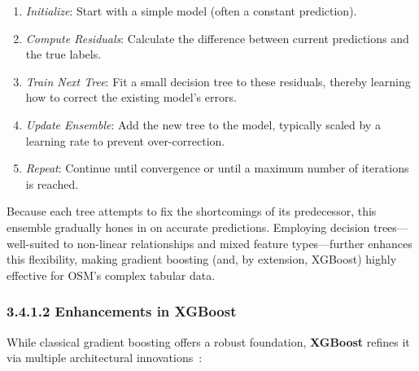 \documentclass[
    13pt, %
    a4paper, %
    listof=totoc, %
    bibliography=totoc, %
    index=totoc, %
    headsepline
]{scrreprt}
\begin{document}
\begin{enumerate}
    \item \emph{Initialize}: Start with a simple model (often a constant prediction).
    \item \emph{Compute Residuals}: Calculate the difference between current predictions and the true labels.
    \item \emph{Train Next Tree}: Fit a small decision tree to these residuals, thereby learning how to correct the existing model’s errors.
    \item \emph{Update Ensemble}: Add the new tree to the model, typically scaled by a learning rate to prevent over-correction.
    \item \emph{Repeat}: Continue until convergence or until a maximum number of iterations is reached.
\end{enumerate}

\noindent
Because each tree attempts to fix the shortcomings of its predecessor, this ensemble gradually hones in on accurate predictions. Employing decision trees—well-suited to non-linear relationships and mixed feature types—further enhances this flexibility, making gradient boosting (and, by extension, XGBoost) highly effective for OSM’s complex tabular data.

\subsubsection{3.4.1.2 Enhancements in XGBoost}
\label{sec:xgboost_enhancements}

\noindent
While classical gradient boosting offers a robust foundation, \textbf{XGBoost} refines it via multiple architectural innovations~\cite{chen2016xgboost}:
\end{document}

